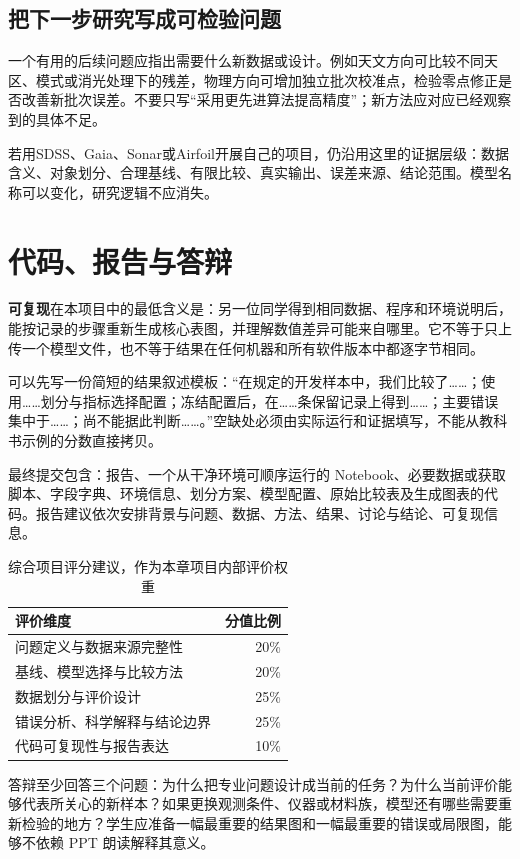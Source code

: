\subsection{把下一步研究写成可检验问题}
一个有用的后续问题应指出需要什么新数据或设计。例如天文方向可比较不同天区、模式或消光处理下的残差，物理方向可增加独立批次校准点，检验零点修正是否改善新批次误差。不要只写“采用更先进算法提高精度”；新方法应对应已经观察到的具体不足。

若用SDSS、Gaia、Sonar或Airfoil开展自己的项目，仍沿用这里的证据层级：数据含义、对象划分、合理基线、有限比较、真实输出、误差来源、结论范围。模型名称可以变化，研究逻辑不应消失。

\section{代码、报告与答辩}

\textbf{可复现}在本项目中的最低含义是：另一位同学得到相同数据、程序和环境说明后，能按记录的步骤重新生成核心表图，并理解数值差异可能来自哪里。它不等于只上传一个模型文件，也不等于结果在任何机器和所有软件版本中都逐字节相同。

可以先写一份简短的结果叙述模板：“在规定的开发样本中，我们比较了……；使用……划分与指标选择配置；冻结配置后，在……条保留记录上得到……；主要错误集中于……；尚不能据此判断……。”空缺处必须由实际运行和证据填写，不能从教科书示例的分数直接拷贝。

最终提交包含：报告、一个从干净环境可顺序运行的 Notebook、必要数据或获取脚本、字段字典、环境信息、划分方案、模型配置、原始比较表及生成图表的代码。报告建议依次安排背景与问题、数据、方法、结果、讨论与结论、可复现信息。

\begin{table}[htbp]\centering\small
\caption{综合项目评分建议，作为本章项目内部评价权重}\begin{tabularx}{\linewidth}{Xr}\toprule
评价维度&分值比例\\\midrule
问题定义与数据来源完整性&20\%\\
基线、模型选择与比较方法&20\%\\
数据划分与评价设计&25\%\\
错误分析、科学解释与结论边界&25\%\\
代码可复现性与报告表达&10\%\\\bottomrule
\end{tabularx}\end{table}

答辩至少回答三个问题：为什么把专业问题设计成当前的任务？为什么当前评价能够代表所关心的新样本？如果更换观测条件、仪器或材料族，模型还有哪些需要重新检验的地方？学生应准备一幅最重要的结果图和一幅最重要的错误或局限图，能够不依赖 PPT 朗读解释其意义。

